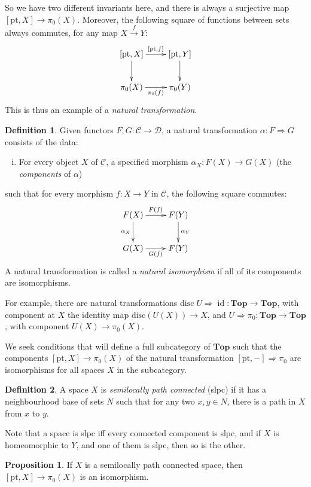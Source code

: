 \documentclass{tufte-handout}
\def\cC {\mathcal{C}}
\def\cD {\mathcal{D}}
\def\pt {\mathrm{pt}}
\def\Top {\mathbf{Top}}
\DeclareMathOperator{\id}{id}
\theoremstyle{definition}
\newtheorem{prop}{Proposition}
\newtheorem{definition}{Definition}
\begin{document}
So we have two different invariants here, and there is always a surjective map 
$[\pt,X]\to \pi_0(X)$. Moreover, the following square of functions between sets always commutes, 
for any map $X\xrightarrow{f}Y$:
\[
\xymatrix{
	[\pt,X] \ar[r]^{[\pt,f]} \ar[d] & [\pt,Y]\ar[d]\\
	\pi_0(X) \ar[r]_{\pi_0(f)} & \pi_0(Y) 
}
\]
This is thus an example of a \emph{natural transformation}.

\begin{definition}
Given functors $F,G\colon \cC \to \cD$, a natural transformation $\alpha\colon F\Rightarrow G$
consists of the data:
\begin{enumerate}[i)]
	\item For every object $X$ of $\cC$, a specified morphism 
		$\alpha_X\colon F(X) \to G(X)$ (the \emph{components} of $\alpha$)
\end{enumerate}
such that for every morphism $f\colon X\to Y$ in $\cC$, the following square commutes:
\[
\xymatrix{
	F(X) \ar[r]^{F(f)} \ar[d]_{\alpha_X} & F(Y)\ar[d]^{\alpha_Y}\\
	G(X) \ar[r]_{G(f)} & F(Y) 
}
\]
A natural transformation is called a \emph{natural isomorphism} if all of its components are 
isomorphisms.
\end{definition}

For example, there are natural transformations 
$\mathrm{disc}\;U \Rightarrow \id\colon \Top \to \Top$, 
with component at $X$ the identity map $\mathrm{disc}(U(X)) \to X$, and 
$U\Rightarrow \pi_0\colon \Top \to \Top$, with component $U(X)\to \pi_0(X)$.

We seek conditions that will define a full subcategory of $\Top$ such that the components
$[\pt,X] \to \pi_0(X)$ of the natural transformation $[\pt,-]\Rightarrow \pi_0$ 
are isomorphisms for all spaces $X$ in the subcategory.

\begin{definition}
A space $X$ is \emph{semilocally path connected} (slpc) if it has a neighbourhood base of sets $N$ such that for any two $x,y\in N$, there is a path in $X$ from $x$ to $y$.
\end{definition}

Note that a space is slpc iff every connected component is slpc, and if $X$ is homeomorphic to $Y$, 
and one of them is slpc, then so is the other.

\begin{prop}
If $X$ is a semilocally path connected space, then $[\pt,X]\to \pi_0(X)$ is 
an isomorphism.
\end{prop}
\end{document}
